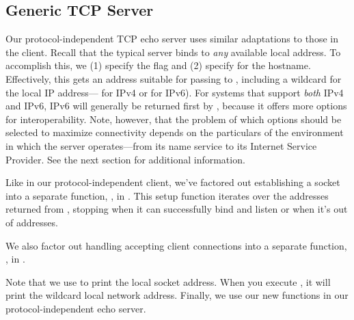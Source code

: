 \subsection{Generic TCP Server}

Our protocol-independent TCP echo server uses similar adaptations to
those in the client.
%
Recall that the typical server binds to \emph{any} available local
address.  To accomplish this, we (1) specify the 
flag and (2) specify  for the hostname.  Effectively,
this gets an address suitable for passing to ,
including a wildcard for the local IP
address--- for IPv4 or
 for IPv6).  For systems that support
\emph{both\/} IPv4 and IPv6, IPv6 will generally be returned
first by , because it offers more options for
interoperability.  Note, however, that the problem of
which options should be selected to maximize connectivity depends on
the particulars of the environment in which the server operates---from
its name service to its Internet Service Provider.
See the next section for additional information.

Like in our protocol-independent client, we've factored out establishing a socket
into a separate function, , in .
This setup function iterates over the addresses returned from ,
stopping when it can successfully bind and listen or when it's out of addresses.


\noindent We also factor out handling accepting client connections into a separate
function, , in .


\noindent Note that we use  to print the
local socket address.  When you execute , it
will print the wildcard local network address.  Finally, we use our new 
functions in our protocol-independent echo server.


